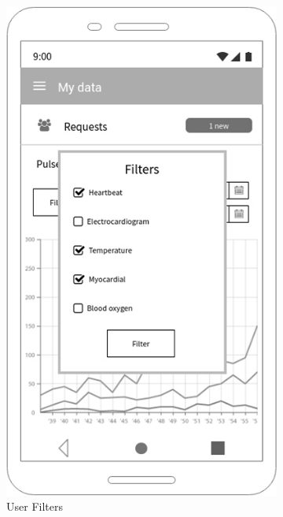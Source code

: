 \begin{figure}[h!]

 \centering

  \begin{subfigure}[b]{0.25\linewidth}

    \includegraphics[width=\linewidth]{img/mockup/u_filters.jpg}

    \caption{User Filters}

  \end{subfigure}
 ~ ~ ~ ~ ~ ~ 
  \begin{subfigure}[b]{0.25\linewidth}


\end{subfigure}
\end{figure}
